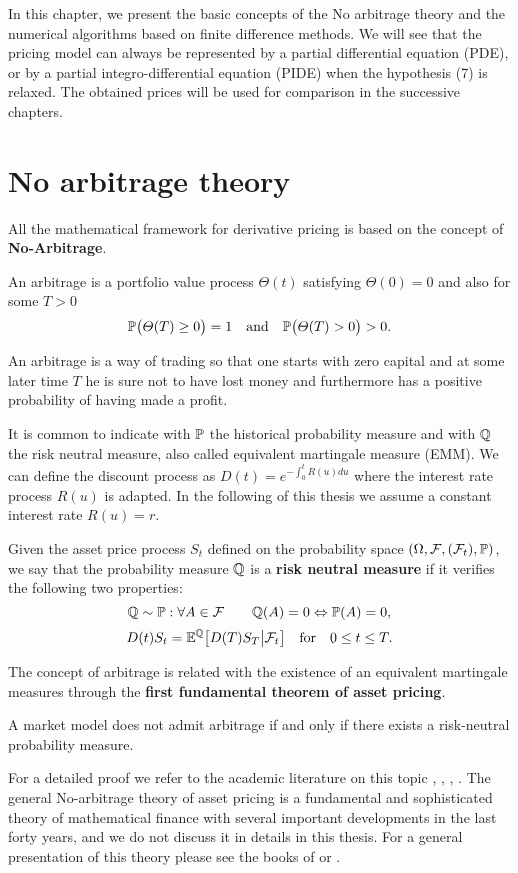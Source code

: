 In this chapter, we present the basic concepts of the No arbitrage theory and the numerical algorithms based on finite difference methods. 
We will see that the pricing model can always be represented by a partial differential equation (PDE), or by a partial integro-differential equation 
(PIDE) when the hypothesis (7) is relaxed. 
The obtained prices will be used for comparison in the successive chapters.


\section{No arbitrage theory}

All the mathematical framework for derivative pricing is based on the concept of \textbf{No-Arbitrage}.
\begin{Definition}
 An arbitrage is a portfolio value process $\varTheta(t)$ satisfying $\varTheta(0)=0$ and also for some $T>0$
 $$ \mathbb{P}\bigl( \varTheta(T) \geq 0 \bigr) = 1 \quad \mbox{and} \quad \mathbb{P}\bigl( \varTheta(T) > 0 \bigr) > 0. $$
\end{Definition}
An arbitrage is a way of trading so that one starts with zero capital and at some later time $T$ he is sure not to have lost money and furthermore has a positive
probability of having made a profit.

It is common to indicate with $\mathbb{P}$ the historical probability measure and with $\mathbb{Q}$ the risk neutral measure, also called equivalent martingale measure (EMM).
We can define the discount process as
$D(t) = e^{-\int_0^t R(u) du}$ where the interest rate process $R(u)$ is adapted. In the following of this thesis we assume a constant interest rate $R(u) = r$.
\begin{Definition}
 Given the asset price process $S_t$ defined on the probability space 
 $(\Omega,\mathcal{F},(\mathcal{F}_{t}),\mathbb{P})$, we say that the probability measure $\mathbb{Q}$ is a \textbf{risk neutral measure}
 if it verifies the following two properties:
 \begin{equation}
 \mathbb{Q} \sim \mathbb{P} : \forall A \in \mathcal{F} \quad \quad \mathbb{Q}(A) = 0 \Leftrightarrow \mathbb{P}(A) = 0,  
 \end{equation}
\begin{equation}
 D(t) S_t = \mathbb{E}^{\mathbb{Q}} \bigl[ D(T) S_T \big| \mathcal{F}_t \bigr] \quad \mbox{for} \quad 0\leq t \leq T.
\end{equation}
\end{Definition}
The concept of arbitrage is related with the existence of an equivalent martingale measures through the \textbf{first fundamental theorem of asset pricing}.
\begin{Theorem}
 A market model does not admit arbitrage if and only if there exists a risk-neutral probability measure. 
\end{Theorem}
For a detailed proof we refer to the academic literature on this topic \cite{HaKr79}, \cite{HaPl81}, \cite{DelSch98}, \cite{Sch02}.
The general No-arbitrage theory of asset pricing is a fundamental and sophisticated theory of mathematical finance with several important developments 
in the last forty years, and we do not discuss it in details in this thesis.
For a general presentation of this theory please see the books of \cite{Musiela} or \cite{Shreve}.

